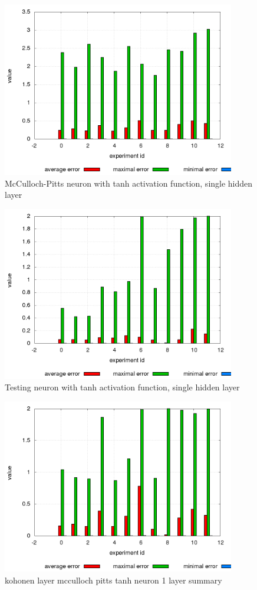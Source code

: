 \documentclass[times]{cpeauth}
\begin{document}
\begin{figure}[!ht]
\centering
\includegraphics[width=4.0in]{images/mcculloch_pitts_tanh_neuron_1_layer_summary_result_log.png}
\caption{McCulloch-Pitts neuron with tanh activation function, single hidden layer}
\label{img:mcculloch_pitts_tanh_neuron}
\end{figure}

\begin{figure}[!ht]
\centering
\includegraphics[width=4.0in]{images/testing_neuron_1_layer_summary_result_log.png}
\caption{Testing neuron with tanh activation function, single hidden layer}
\label{img:testing_neuron_1_layer_summary}
\end{figure}

\begin{figure}[!ht]
\centering
\includegraphics[width=4.0in]{images/kohonen_layer_mcculloch_pitts_tanh_neuron_1_layer_summary_result_log.png}
\caption{kohonen layer mcculloch pitts tanh neuron 1 layer summary}
\label{img:kohonen_layer_mcculloch_pitts_tanh_neuron_1_layer_summary}
\end{figure}
\end{document}
